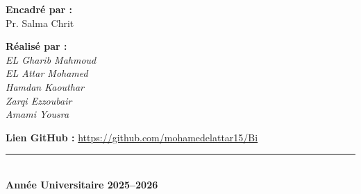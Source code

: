 \documentclass[12pt,a4paper,twoside]{report}
\begin{document}
\begin{titlepage}
  \vspace{0.45cm}

  \begin{tcolorbox}[
    colback=LightGray,
    colframe=MidGray!45,
    width=\linewidth,
    arc=4pt,
    boxrule=0.6pt,
    left=12pt,
    right=12pt,
    top=8pt,
    bottom=8pt
  ]
    \noindent
    \begin{minipage}[t]{0.48\linewidth}
      \textbf{\textcolor{PrimaryRed}{Encadré par :}}\\[0.15cm]
      Pr. Salma Chrit
    \end{minipage}
    \hfill
    \begin{minipage}[t]{0.48\linewidth}
      \raggedleft
      \textbf{\textcolor{PrimaryRed}{Réalisé par :}}\\[0.15cm]
     \textit{EL Gharib Mahmoud}\\
      \textit{EL Attar Mohamed}\\
      \textit{Hamdan Kaouthar}\\
      \textit{Zarqi Ezzoubair}\\
       \textit{Amami Yousra}
    \end{minipage}
  \end{tcolorbox}

  \vspace{0.15cm}
  \noindent
  \textbf{\textcolor{PrimaryRed}{Lien GitHub :}} \href{https://github.com/mohamedelattar15/Bi}{https://github.com/mohamedelattar15/Bi}

  \vspace{0.35cm}

  \begin{center}
    \textcolor{PrimaryRed}{\rule{0.45\linewidth}{0.8pt}}\\[0.25cm]
    {\large\bfseries Année Universitaire 2025--2026}
  \end{center}
\end{titlepage}

\newpage
{}
\setcounter{page}{1}

\tableofcontents
\newpage

\listoffigures
\newpage

\listoftables
\newpage

\setcounter{page}{1}
\end{document}
